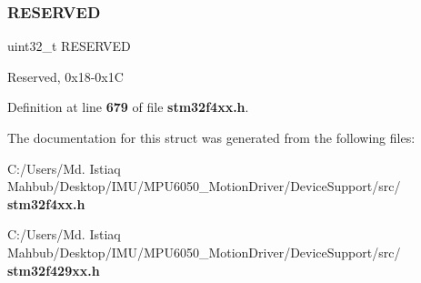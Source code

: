 \mbox{\label{structSYSCFG__TypeDef_a896190d6ac50dc6d53ff0c0c2520a4ad}} 
\subsubsection{R\+E\+S\+E\+R\+V\+ED}
{\footnotesize\ttfamily uint32\+\_\+t R\+E\+S\+E\+R\+V\+ED}

Reserved, 0x18-\/0x1C 

Definition at line \textbf{ 679} of file \textbf{ stm32f4xx.\+h}.



The documentation for this struct was generated from the following files\+:\begin{DoxyCompactItemize}
\item 
C\+:/\+Users/\+Md. Istiaq Mahbub/\+Desktop/\+I\+M\+U/\+M\+P\+U6050\+\_\+\+Motion\+Driver/\+Device\+Support/src/\textbf{ stm32f4xx.\+h}\item 
C\+:/\+Users/\+Md. Istiaq Mahbub/\+Desktop/\+I\+M\+U/\+M\+P\+U6050\+\_\+\+Motion\+Driver/\+Device\+Support/src/\textbf{ stm32f429xx.\+h}\end{DoxyCompactItemize}
